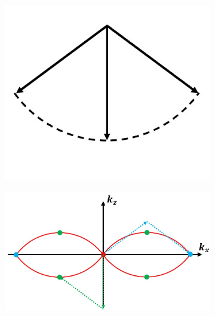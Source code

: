 \begin{figure}
	\centering
	\begin{subfigure}[t]{0.35\textwidth}
		\centering
		\includegraphics[width=\linewidth]{images/amplitude_wave_vectors.jpg}
		\caption{}
		\label{fig:amplitude_wave_vectors}
	\end{subfigure}
	\begin{subfigure}[t]{0.6\textwidth}
		\centering
		\includegraphics[width=\linewidth]{images/3D_SIM_OTF_beam_pos_w_vectors.jpg}
		\caption{}
		\label{fig:3D_SIM_OTF_beam_pos_w_vectors}
	\end{subfigure}
	

\end{figure}
